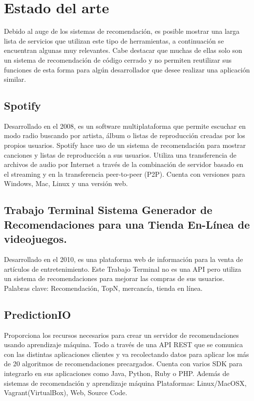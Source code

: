 \chapter {Estado del arte}
  Debido al auge de los sistemas de recomendación, es posible mostrar una larga lista de servicios que utilizan este tipo de herramientas, a continuación se encuentran algunas muy relevantes. Cabe destacar que muchas de ellas solo son un sistema de recomendación de código cerrado y no permiten reutilizar sus funciones de esta forma para algún desarrollador que desee realizar una aplicación similar.

  \section {Spotify}
    Desarrollado en el 2008, es un software multiplataforma que permite escuchar en modo radio buscando por artista, álbum o listas de reproducción creadas por los propios usuarios. Spotify hace uso de un sistema de recomendación para mostrar canciones y listas de reproducción a sus usuarios. Utiliza una transferencia de archivos de audio por Internet a través de la combinación de servidor basado en el streaming y en la transferencia peer-to-peer (P2P). Cuenta con versiones para Windows, Mac, Linux y una versión web. \cite{4}

  \section{Trabajo Terminal Sistema Generador de Recomendaciones para una Tienda En-Línea de videojuegos.} 
    Desarrollado en el 2010, es una plataforma web de información para la venta de artículos de entretenimiento. Este Trabajo Terminal no es una API pero utiliza un sistema de recomendaciones para mejorar las compras de sus usuarios. Palabras clave: Recomendación, TopN, mercancía, tienda en línea.\cite{5}

  \section{PredictionIO}
    Proporciona los recursos necesarios para crear un servidor de recomendaciones usando aprendizaje máquina. Todo a través de una API REST que se comunica con las distintas aplicaciones clientes y va recolectando datos para aplicar los más de 20 algoritmos de recomendaciones precargados. Cuenta con varios SDK para integrarlo en sus aplicaciones como Java, Python, Ruby o PHP. Además de sistemas de recomendación y aprendizaje máquina Plataformas: Linux/MacOSX, Vagrant(VirtualBox), Web, Source Code.\cite{6}

